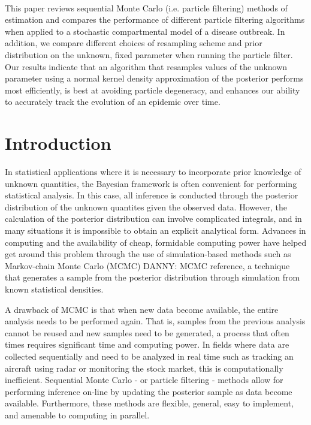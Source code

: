 \documentclass{elsarticle}
\newcommand{\danny}[1]{{\color{blue}DANNY: #1}}
\begin{document}
 \\

This paper reviews sequential Monte Carlo (i.e. particle filtering) methods of estimation and compares the performance of different particle filtering algorithms when applied to a stochastic compartmental model of a disease outbreak.  In addition, we compare different choices of resampling scheme and prior distribution on the unknown, fixed parameter when running the particle filter.  Our results indicate that an algorithm that resamples values of the unknown parameter using a normal kernel density approximation of the posterior performs most efficiently, is best at avoiding particle degeneracy, and enhances our ability to accurately track the evolution of an epidemic over time.

\section{Introduction} \label{sec:intro}

In statistical applications where it is necessary to incorporate prior knowledge of unknown quantities, the Bayesian framework is often convenient for performing statistical analysis.  In this case, all inference is conducted through the posterior distribution of the unknown quantites given the observed data.  However, the calculation of the posterior distribution can involve complicated integrals, and in many situations it is impossible to obtain an explicit analytical form.  Advances in computing and the availability of cheap, formidable computing power have helped get around this problem through the use of simulation-based methods such as Markov-chain Monte Carlo (MCMC) \danny{MCMC reference}, a technique that generates a sample from the posterior distribution through simulation from known statistical densities.

A drawback of MCMC is that when new data become available, the entire analysis needs to be performed again.  That is, samples from the previous analysis cannot be reused and new samples need to be generated, a process that often times requires significant time and computing power.  In fields where data are collected sequentially and need to be analyzed in real time such as tracking an aircraft using radar or monitoring the stock market, this is computationally inefficient.  Sequential Monte Carlo - or particle filtering - methods allow for performing inference on-line by updating the posterior sample as data become available.  Furthermore, these methods are flexible, general, easy to implement, and amenable to computing in parallel.
\end{document}
